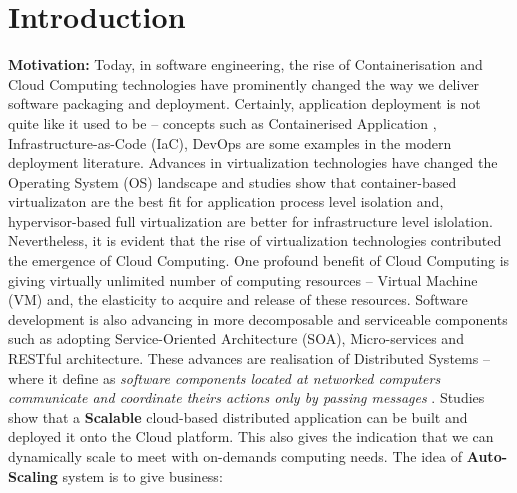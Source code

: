 
\chapter{Introduction} %

\label{Chapter1} %


\newcommand{\keyword}[1]{\textbf{#1}}
\newcommand{\tabhead}[1]{\textbf{#1}}
\newcommand{\code}[1]{\texttt{#1}}
\newcommand{\file}[1]{\texttt{\bfseries#1}}
\newcommand{\option}[1]{\texttt{\itshape#1}}



\textbf{Motivation:} \quad Today, in software engineering, the rise of Containerisation \parencite{Scheepers2014VirtualizationAC} and Cloud Computing \parencite{Armbrust:2010:VCC:1721654.1721672} technologies have prominently changed the way we deliver  software packaging and deployment. Certainly, application deployment is not quite like it used to be -- concepts such as Containerised Application \parencite{Merkel:2014:DLL:2600239.2600241}, Infrastructure-as-Code (IaC), DevOps \parencite{httermann2012devops} are some examples in the modern deployment literature. Advances in virtualization technologies have changed the Operating System (OS) landscape and studies \parencite{Kozhirbayev2017APC} \parencite{5708625} show that container-based virtualizaton are the best fit for application process level isolation and, hypervisor-based full virtualization are better for infrastructure level islolation. Nevertheless, it is evident that the rise of virtualization technologies contributed the emergence of Cloud Computing. One profound benefit of Cloud Computing is giving virtually unlimited number of computing resources -- Virtual Machine (VM) and, the elasticity to acquire and release of these resources. Software development is also advancing in more decomposable and serviceable components such as adopting Service-Oriented Architecture (SOA), Micro-services and RESTful architecture. These advances are realisation of Distributed Systems -- where it define as \textit{software components located at networked computers communicate and coordinate theirs actions only by passing messages} \parencite{Coulouris:2011:DSC:2029110}. Studies \parencite{Sinnott:2016:SCS:3008079.3008128} show that a \textbf{Scalable} cloud-based distributed application can be built and deployed it onto the Cloud platform. This also gives the indication that we can dynamically scale to meet with on-demands computing needs. The idea of \textbf{Auto-Scaling} system is to give business:

